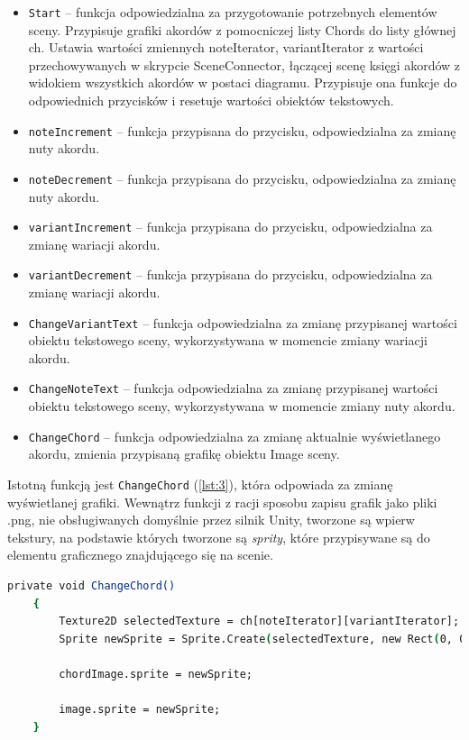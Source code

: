 \begin{itemize}
    \item \texttt{Start} -- funkcja odpowiedzialna za przygotowanie potrzebnych elementów sceny. Przypisuje grafiki akordów z pomocniczej listy Chords do listy głównej ch. Ustawia wartości zmiennych noteIterator, variantIterator z wartości przechowywanych w skrypcie SceneConnector, łączącej scenę księgi akordów z widokiem wszystkich akordów w postaci diagramu. Przypisuje ona funkcje do odpowiednich przycisków i resetuje wartości obiektów tekstowych.
    \item \texttt{noteIncrement} -- funkcja przypisana do przycisku, odpowiedzialna za zmianę nuty akordu.
    \item \texttt{noteDecrement} -- funkcja przypisana do przycisku, odpowiedzialna za zmianę nuty akordu.
    \item \texttt{variantIncrement} -- funkcja przypisana do przycisku, odpowiedzialna za zmianę wariacji akordu.
    \item \texttt{variantDecrement} -- funkcja przypisana do przycisku, odpowiedzialna za zmianę wariacji akordu.
    \item \texttt{ChangeVariantText} -- funkcja odpowiedzialna za zmianę przypisanej wartości obiektu tekstowego sceny, wykorzystywana w momencie zmiany wariacji akordu.
    \item \texttt{ChangeNoteText} -- funkcja odpowiedzialna za zmianę przypisanej wartości obiektu tekstowego sceny, wykorzystywana w momencie zmiany nuty akordu.
    \item \texttt{ChangeChord} -- funkcja odpowiedzialna za zmianę aktualnie wyświetlanego akordu, zmienia przypisaną grafikę obiektu Image sceny.
\end{itemize}

Istotną funkcją jest \texttt{ChangeChord} (\ref{lst:3}), która odpowiada za zmianę wyświetlanej grafiki. Wewnątrz funkcji z racji sposobu zapisu grafik jako pliki .png, nie obsługiwanych domyślnie przez silnik Unity, tworzone są wpierw tekstury, na podstawie których tworzone są \emph{sprity}, które przypisywane są do elementu graficznego znajdującego się na scenie.

\begin{lstlisting}[language=csh,caption=Funkcja \texttt{ChangeChord}, label=lst:3]
    private void ChangeChord()
    {
        Texture2D selectedTexture = ch[noteIterator][variantIterator];
        Sprite newSprite = Sprite.Create(selectedTexture, new Rect(0, 0, selectedTexture.width, selectedTexture.height), new Vector2(0.5f, 0.5f));
        
        chordImage.sprite = newSprite;
        
        image.sprite = newSprite;
    }
\end{lstlisting}

